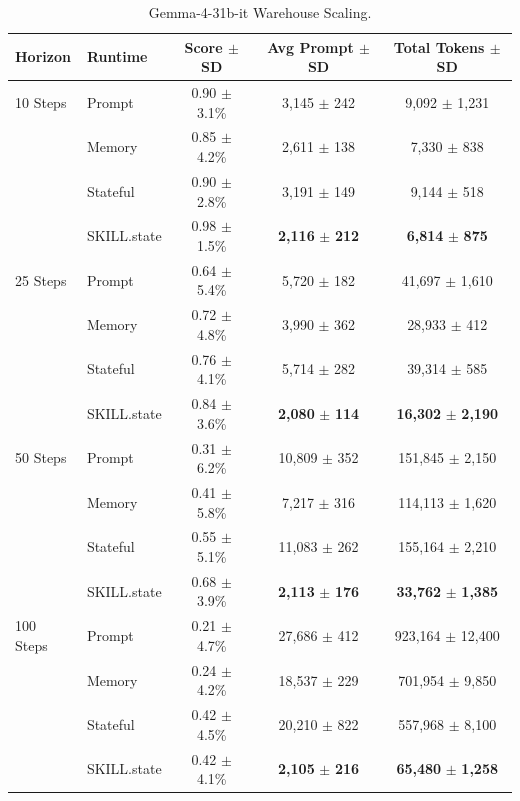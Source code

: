 \documentclass[11pt]{article}
\begin{document}
\begin{table}[t]
\centering
\caption{Gemma-4-31b-it Warehouse Scaling.}
\label{tab:env1_exp1_gemma}
\begin{tabular}{llccc}
\toprule
\textbf{Horizon} & \textbf{Runtime} & \textbf{Score $\pm$ SD} & \textbf{Avg Prompt $\pm$ SD} & \textbf{Total Tokens $\pm$ SD} \\
\midrule
10 Steps & Prompt & 0.90 $\pm$ 3.1\% & 3,145 $\pm$ 242 & 9,092 $\pm$ 1,231 \\
& Memory & 0.85 $\pm$ 4.2\% & 2,611 $\pm$ 138 & 7,330 $\pm$ 838 \\
& Stateful & 0.90 $\pm$ 2.8\% & 3,191 $\pm$ 149 & 9,144 $\pm$ 518 \\
& SKILL.state & 0.98 $\pm$ 1.5\% & \textbf{2,116} $\pm$ \textbf{212} & \textbf{6,814} $\pm$ \textbf{875} \\
\midrule
25 Steps & Prompt & 0.64 $\pm$ 5.4\% & 5,720 $\pm$ 182 & 41,697 $\pm$ 1,610 \\
& Memory & 0.72 $\pm$ 4.8\% & 3,990 $\pm$ 362 & 28,933 $\pm$ 412 \\
& Stateful & 0.76 $\pm$ 4.1\% & 5,714 $\pm$ 282 & 39,314 $\pm$ 585 \\
& SKILL.state & 0.84 $\pm$ 3.6\% & \textbf{2,080} $\pm$ \textbf{114} & \textbf{16,302} $\pm$ \textbf{2,190} \\
\midrule
50 Steps & Prompt & 0.31 $\pm$ 6.2\% & 10,809 $\pm$ 352 & 151,845 $\pm$ 2,150 \\
& Memory & 0.41 $\pm$ 5.8\% & 7,217 $\pm$ 316 & 114,113 $\pm$ 1,620 \\
& Stateful & 0.55 $\pm$ 5.1\% & 11,083 $\pm$ 262 & 155,164 $\pm$ 2,210 \\
& SKILL.state & 0.68 $\pm$ 3.9\% & \textbf{2,113} $\pm$ \textbf{176} & \textbf{33,762} $\pm$ \textbf{1,385} \\
\midrule
100 Steps & Prompt & 0.21 $\pm$ 4.7\% & 27,686 $\pm$ 412 & 923,164 $\pm$ 12,400 \\
& Memory & 0.24 $\pm$ 4.2\% & 18,537 $\pm$ 229 & 701,954 $\pm$ 9,850 \\
& Stateful & 0.42 $\pm$ 4.5\% & 20,210 $\pm$ 822 & 557,968 $\pm$ 8,100 \\
& SKILL.state & 0.42 $\pm$ 4.1\% & \textbf{2,105} $\pm$ \textbf{216} & \textbf{65,480} $\pm$ \textbf{1,258} \\
\bottomrule
\end{tabular}
\end{table}
\end{document}
